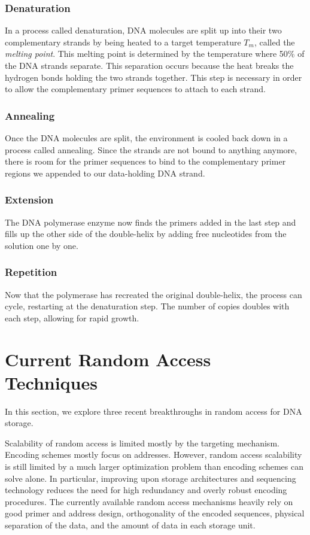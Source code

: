 \documentclass[a4paper,conference]{IEEEtran}
\begin{document}
\subsubsection{Denaturation}
In a process called denaturation, DNA molecules are split up into their two complementary strands by being heated to a target temperature $T_m$, called the \textit{melting point}. This melting point is determined by the temperature where 50\% of the DNA strands separate. This separation occurs because the heat breaks the hydrogen bonds holding the two strands together. This step is necessary in order to allow the complementary primer sequences to attach to each strand.

\subsubsection{Annealing}
Once the DNA molecules are split, the environment is cooled back down in a process called annealing. Since the strands are not bound to anything anymore, there is room for the primer sequences to bind to the complementary primer regions we appended to our data-holding DNA strand.

\subsubsection{Extension}
The DNA polymerase enzyme now finds the primers added in the last step and fills up the other side of the double-helix by adding free nucleotides from the solution one by one.

\subsubsection{Repetition}
Now that the polymerase has recreated the original double-helix, the process can cycle, restarting at the denaturation step. The number of copies doubles with each step, allowing for rapid growth.

\section{Current Random Access Techniques}
In this section, we explore three recent breakthroughs in random access for DNA storage.

Scalability of random access is limited mostly by the targeting mechanism. Encoding schemes mostly focus on addresses. However, random access scalability is still limited by a much larger optimization problem than encoding schemes can solve alone. In particular, improving upon storage architectures and sequencing technology reduces the need for high redundancy and overly robust encoding procedures. The currently available random access mechanisms heavily rely on good primer and address design, orthogonality of the encoded sequences, physical separation of the data, and the amount of data in each storage unit.
\end{document}
